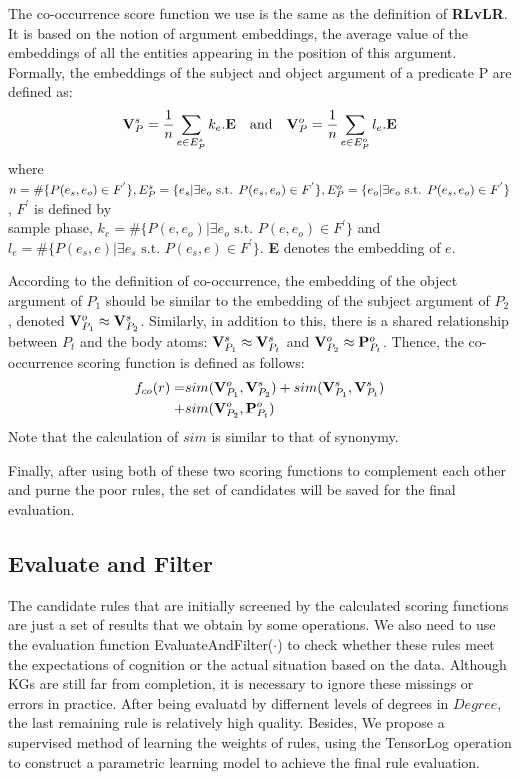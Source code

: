 \documentclass{article}
\begin{document}
	The co-occurrence score function we use is the same as the definition of {\bf RLvLR}. It is based on the notion of argument embeddings, the average value of
the embeddings of all the entities appearing in the position of
this argument. Formally, the embeddings of the subject and
object argument of a predicate P are defined as:
	$$
	{\bf V}_P^s = \frac{1}{n} \sum _{e \in E_P^s}k_e.{\bf E} \text{\quad and\quad}	
	{\bf V}_P^o = \frac{1}{n} \sum _{e \in E_P^o}l_e.{\bf E} 
	$$ 
	where $n = \#\{P(e_s, e_o) \in F^{'}\}, E_P^s = \{e_s|\exists e_o \text{ s.t. } P(e_s, e_o)\\
	\in F^{'}\} , E_P^o = \{e_o|\exists e_o \text{ s.t. } P(e_s, e_o) \in F^{'}\}$, $F^{'}$ is defined by\\
	sample phase, $k_e = \#\{P(e, e_o)|\exists e_o \text{ s.t. } P(e, e_o) \in F^{'} \}$ and
$l_e = \#\{P(e_s,e)|\exists e_s \text{ s.t. } P(e_s, e) \in F^{'} \}$. {\bf E} denotes the embedding of $e$.
	
	According to the definition of co-occurrence, the embedding of the object argument of $P_1$ should be similar to the
embedding of the subject argument of $P_2$, denoted ${\bf V}^o_{P_1} \approx {\bf V}^s_{P_2}$.
Similarly, in addition to this, there is a shared relationship between $P_t$ and the body atoms: ${\bf V}^s_{P_1} \approx {\bf V}^s_{P_t}$ and ${\bf V}^o_{P_2} \approx {\bf P}^o_{P_t}$. Thence, the co-occurrence scoring function is defined as follows:
	\begin{align}
	f_{co}(r) = &sim({\bf V}^o_{P_1}, {\bf V}^s_{P_2}) + sim({\bf V}^s_{P_1}, {\bf V}^s_{P_t}) \nonumber\\
	 +& sim({\bf V}^o_{P_2}, {\bf P}^o_{P_t}) 
	\end{align}
	Note that the calculation of $sim$ is similar to that of synonymy.
	
	Finally, after using both of these two scoring functions to complement each other and purne the poor rules, the set of candidates will be saved for the final evaluation.
	

	
	
	\subsection{Evaluate and Filter}
	The candidate rules that are initially screened by the calculated scoring functions are just a set of results that we obtain by some operations. We also need to use the evaluation function \textsf{EvaluateAndFilter($\cdot$) }to check whether these rules meet the expectations of cognition or the actual situation based on the data. Although KGs are still far from completion, it is necessary to ignore these missings or errors in practice. After being evaluatd by differnent levels of degrees in $Degree$, the last remaining rule is relatively high quality.
	Besides, We propose a supervised method of learning the weights of rules, using the TensorLog operation to construct a parametric learning model to achieve the final rule evaluation.
\end{document}
